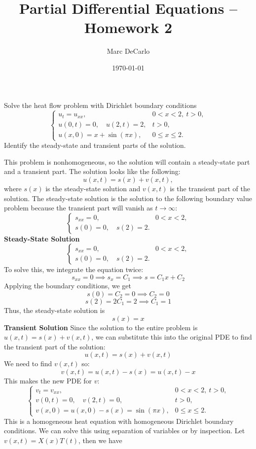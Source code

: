 \documentclass[12pt]{article}
\title{Partial Differential Equations -- Homework 2}
\author{Marc DeCarlo}
\date{\today}
\begin{document}
\maketitle

Solve the heat flow problem with Dirichlet boundary conditions
\[
\begin{cases}
u_t = u_{xx}, & 0 < x < 2,\ t > 0, \\
u(0,t) = 0,\quad u(2,t) = 2, & t > 0, \\
u(x,0) = x + \sin(\pi x), & 0 \leq x \leq 2.
\end{cases}
\]
Identify the steady-state and transient parts of the solution.

\sol
This problem is nonhomogeneous, so the solution will contain a steady-state part and a transient part. The solution looks like the following:
\[
u(x,t) = s(x) + v(x,t),
\]
where $s(x)$ is the steady-state solution and $v(x,t)$ is the transient part of the solution. The steady-state solution is the solution to the following boundary value problem because the transient part will vanish as $t \to \infty$:
\[
\begin{cases}
s_{xx} = 0, & 0 < x < 2, \\
s(0) = 0,\quad s(2) = 2.
\end{cases}
\]
\textbf{Steady-State Solution}
\[
\begin{cases}
s_{xx} = 0, & 0 < x < 2, \\
s(0) = 0,\quad s(2) = 2.
\end{cases}
\]
To solve this, we integrate the equation twice:
\[
s_{xx} = 0 \implies s_x = C_1 \implies s = C_1 x + C_2
\]
Applying the boundary conditions, we get
\[
s(0) = C_2 = 0 \implies C_2 = 0
\]
\[
s(2) = 2C_1 = 2 \implies C_1 = 1
\]
Thus, the steady-state solution is
\[
s(x) = x
\]
\textbf{Transient Solution}
Since the solution to the entire problem is $u(x,t) = s(x) + v(x,t)$, we can substitute this into the original PDE to find the transient part of the solution:
\[
u(x,t) = s(x) + v(x,t) 
\]
We need to find $v(x,t)$ so:
\[
v(x,t) = u(x,t) - s(x) = u(x,t) - x
\]
This makes the new PDE for $v$:
\[
\begin{cases}
v_t = v_{xx}, & 0 < x < 2,\ t > 0, \\
v(0,t) = 0,\quad v(2,t) = 0, & t > 0, \\
v(x,0) = u(x,0) - s(x) = \sin(\pi x), & 0 \leq x \leq 2.
\end{cases}
\]
This is a homogeneous heat equation with homogeneous Dirichlet boundary conditions. We can solve this using separation of variables or by inspection. Let $v(x,t) = X(x)T(t)$, then we have
\end{document}
